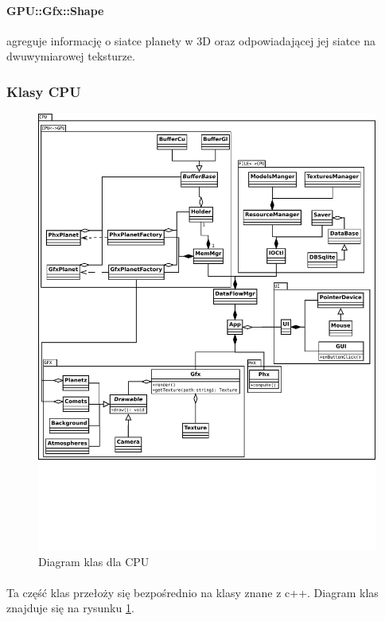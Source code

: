 \paragraph{GPU::Gfx::Shape} agreguje informację o siatce planety w 3D oraz odpowiadającej jej siatce na dwuwymiarowej teksturze.

\subsubsection{Klasy CPU}

\begin{figure}[ht!]
	\centering
	\includegraphics[angle=0,width=\textwidth]{class_cpu.pdf}
	\caption{Diagram klas dla CPU}
	\label{fig:class_cpu}
\end{figure}

\paragraph{}
Ta część klas przełoży się bezpośrednio na klasy znane z c++. Diagram klas znajduje się na rysunku \ref{fig:class_cpu}.

